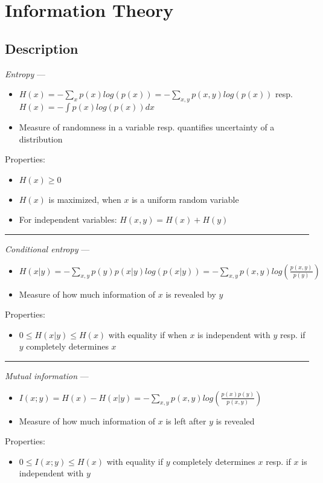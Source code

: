 \section{Information Theory}
\subsection*{Description}
\emph{Entropy} --- 
\begin{itemize}
    \item $H(x) = -\sum_x p(x)log(p(x)) = -\sum_{x,y} p(x,y)log(p(x))$ resp. $H(x) = -\int p(x)log(p(x))dx$
    \item Measure of randomness in a variable resp. quantifies uncertainty of a distribution
\end{itemize}
Properties:
\begin{itemize}
    \item $H(x) \geq 0$
    \item $H(x)$ is maximized, when $x$ is a uniform random variable
    \item For independent variables: $H(x,y) = H(x) + H(y)$
\end{itemize}

{\color{lightgray}\hrule height 0.001mm}

\emph{Conditional entropy} --- 
\begin{itemize}
    \item $H(x|y) = -\sum_{x,y} p(y)p(x|y)log(p(x|y)) = -\sum_{x,y} p(x,y)log(\frac{p(x,y)}{p(y)})$ 
    \item Measure of how much information of $x$ is revealed by $y$
\end{itemize}
Properties:
\begin{itemize}
    \item $0 \leq H(x|y) \leq H(x)$ with equality if when $x$ is independent with $y$ resp. if $y$ completely determines $x$
\end{itemize}

{\color{lightgray}\hrule height 0.001mm}

\emph{Mutual information} --- 
\begin{itemize}
    \item $I(x;y) = H(x) - H(x|y) = -\sum_{x,y} p(x,y) log(\frac{p(x)p(y)}{p(x,y)})$ 
    \item Measure of how much information of $x$ is left after $y$ is revealed
\end{itemize}
Properties:
\begin{itemize}
    \item $0 \leq I(x;y) \leq H(x)$ with equality if $y$ completely determines $x$ resp. if $x$ is independent with $y$
\end{itemize}

